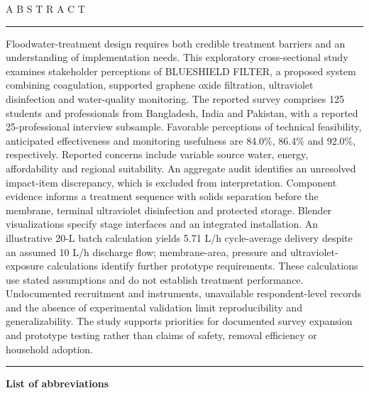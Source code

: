 \documentclass{ieeeaccess}
\begin{document}
\begin{minipage}[t]{0.695\textwidth}
\vspace{0pt}
{\normalfont\fontsize{9}{11}\selectfont A B S T R A C T\par}
\vspace{5pt}\hrule\vspace{7pt}
{\normalfont\fontsize{10}{12}\selectfont\noindent
Floodwater-treatment design requires both credible treatment barriers and an understanding of implementation needs. This exploratory cross-sectional study examines stakeholder perceptions of BLUESHIELD FILTER, a proposed system combining coagulation, supported graphene oxide filtration, ultraviolet disinfection and water-quality monitoring. The reported survey comprises 125 students and professionals from Bangladesh, India and Pakistan, with a reported 25-professional interview subsample. Favorable perceptions of technical feasibility, anticipated effectiveness and monitoring usefulness are 84.0\%, 86.4\% and 92.0\%, respectively. Reported concerns include variable source water, energy, affordability and regional suitability. An aggregate audit identifies an unresolved impact-item discrepancy, which is excluded from interpretation. Component evidence informs a treatment sequence with solids separation before the membrane, terminal ultraviolet disinfection and protected storage. Blender visualizations specify stage interfaces and an integrated installation. An illustrative 20-L batch calculation yields 5.71 L/h cycle-average delivery despite an assumed 10 L/h discharge flow; membrane-area, pressure and ultraviolet-exposure calculations identify further prototype requirements. These calculations use stated assumptions and do not establish treatment performance. Undocumented recruitment and instruments, unavailable respondent-level records and the absence of experimental validation limit reproducibility and generalizability. The study supports priorities for documented survey expansion and prototype testing rather than claims of safety, removal efficiency or household adoption.
\par}
\end{minipage}
\par\vspace{17pt}\noindent\rule{\textwidth}{0.45pt}
\par\vspace{8pt}
{\noindent\normalfont\bfseries\fontsize{9}{12}\selectfont List of abbreviations\par}
\vspace{6pt}
\end{document}
